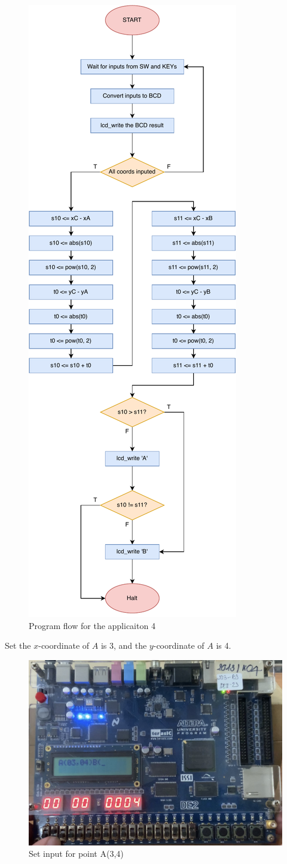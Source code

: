 \documentclass[12pt,a4paper,oneside]{book} %
\begin{document}
\begin{figure}[H]
    \centering
    \includegraphics[width=.5\textwidth]{images/flowchart/app4.pdf}
    \caption{Program flow for the applicaiton 4}
\end{figure}

Set the $x$-coordinate of $A$ is 3, and the $y$-coordinate of $A$ is 4. 

 \begin{figure}[H]
    \begin{center}
    \includegraphics[width=.85\textwidth]{images/applicationA.jpg}
    \caption{Set input for point A(3,4)}
    \end{center}
\end{figure}
\end{document}
